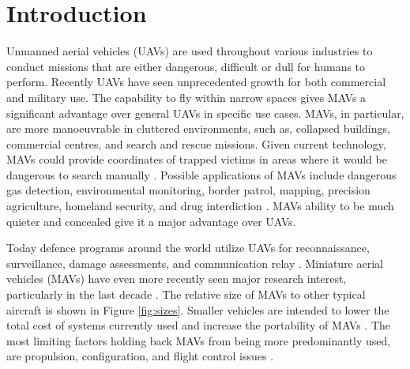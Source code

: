 \graphicspath{{./Figs/}}

\chapter{Introduction} 
\label{sec:Background}




Unmanned aerial vehicles (UAVs) are used throughout various industries to conduct missions that are either dangerous, difficult or dull for humans to perform. Recently UAVs have seen unprecedented growth for both commercial \cite{Liu2014} and military \cite{Chaturvedi2019} \cite{Fan2018} use. The capability to fly within narrow spaces gives MAVs a significant advantage over general UAVs in specific use cases. MAVs, in particular, are more manoeuvrable in cluttered environments, such as, collapsed buildings, commercial centres, and search and rescue missions. Given current technology, MAVs could provide coordinates of trapped victims in areas where it would be dangerous to search manually  \cite{Valavanis2007}. Possible applications of MAVs include dangerous gas detection, environmental monitoring, border patrol, mapping, precision agriculture, homeland security, and drug interdiction \cite{Liu2014} \cite{Valavanis2007}. MAVs ability to be much quieter and concealed give it a major advantage over UAVs.


Today defence programs around the world utilize UAVs for reconnaissance, surveillance, damage assessments, and communication relay \cite{Chaturvedi2019} \cite{Fan2018} \cite{Valavanis2007}. Miniature aerial vehicles (MAVs) have even more recently seen major research interest, particularly in the last decade \cite{Valavanis2007}.  The relative size of MAVs to other typical aircraft is shown in Figure \ref{fig:sizes}. Smaller vehicles are intended to lower the total cost of systems currently used and increase the portability of MAVs \cite{Stephen2022}. The most limiting factors holding back MAVs from being more predominantly used, are propulsion, configuration, and flight control issues \cite{Stephen2022}.


